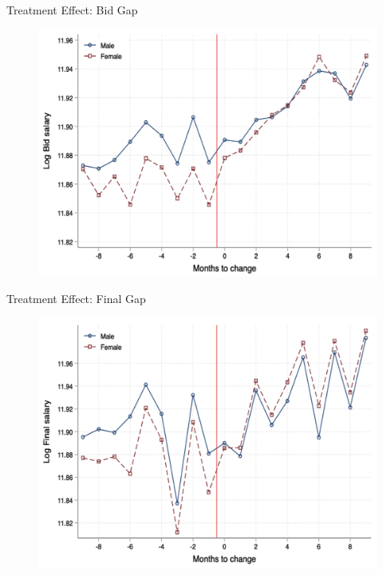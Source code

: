 \begin{frame}{Treatment Effect: Bid Gap}
    \begin{figure}
        \centering
        \includegraphics[height = 0.75 \textheight]{images/treat_bid.png}
    \end{figure}
\end{frame}

\begin{frame}{Treatment Effect: Final Gap}
    \begin{figure}
        \centering
        \includegraphics[height = 0.75 \textheight]{images/treat_final.png}
    \end{figure}
\end{frame}